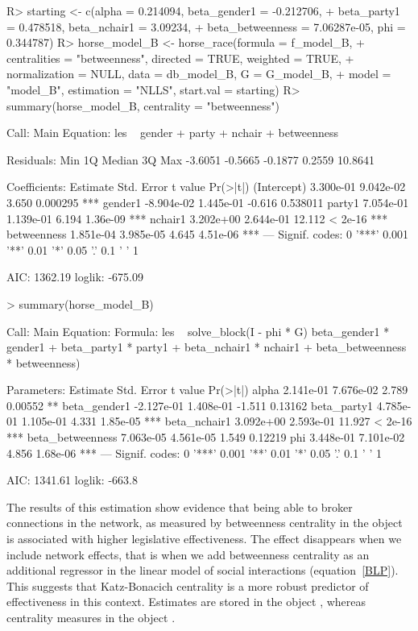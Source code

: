 \documentclass[nojss]{jss}
\begin{document}
\begin{CodeChunk}
\begin{CodeInput}
R> starting <- c(alpha = 0.214094, beta_gender1 = -0.212706,
+    beta_party1 = 0.478518, beta_nchair1 = 3.09234,
+    beta_betweenness = 7.06287e-05, phi = 0.344787) 
R> horse_model_B <- horse_race(formula = f_model_B, 
+    centralities = "betweenness", directed = TRUE, weighted = TRUE, 
+    normalization = NULL, data = db_model_B, G = G_model_B,
+    model = "model_B", estimation = "NLLS", start.val = starting)
R> summary(horse_model_B, centrality = "betweenness")
\end{CodeInput}
\begin{CodeOutput}
Call:
Main Equation:  les ~ gender + party + nchair + betweenness

Residuals:
Min      1Q  Median      3Q     Max 
-3.6051 -0.5665 -0.1877  0.2559 10.8641 

Coefficients:
Estimate Std. Error t value Pr(>|t|)    
(Intercept)  3.300e-01  9.042e-02   3.650 0.000295 ***
gender1     -8.904e-02  1.445e-01  -0.616 0.538011    
party1       7.054e-01  1.139e-01   6.194 1.36e-09 ***
nchair1      3.202e+00  2.644e-01  12.112  < 2e-16 ***
betweenness  1.851e-04  3.985e-05   4.645 4.51e-06 ***
---
Signif. codes:  0 '***' 0.001 '**' 0.01 '*' 0.05 '.' 0.1 ' ' 1

AIC: 1362.19  loglik: -675.09
\end{CodeOutput}
\begin{CodeInput}
> summary(horse_model_B)
\end{CodeInput}
\begin{CodeOutput}
Call:
Main Equation:
Formula: les ~ solve_block(I - phi * G) %
beta_gender1 * gender1 + beta_party1 * party1 + 
beta_nchair1 * nchair1 + beta_betweenness * betweenness)

Parameters:
Estimate Std. Error t value Pr(>|t|)    
alpha             2.141e-01  7.676e-02   2.789  0.00552 ** 
beta_gender1     -2.127e-01  1.408e-01  -1.511  0.13162    
beta_party1       4.785e-01  1.105e-01   4.331 1.85e-05 ***
beta_nchair1      3.092e+00  2.593e-01  11.927  < 2e-16 ***
beta_betweenness  7.063e-05  4.561e-05   1.549  0.12219    
phi               3.448e-01  7.101e-02   4.856 1.68e-06 ***
---
Signif. codes:  0 '***' 0.001 '**' 0.01 '*' 0.05 '.' 0.1 ' ' 1

AIC: 1341.61  loglik: -663.8
\end{CodeOutput}
\end{CodeChunk}

The results of this estimation show evidence that being able to broker connections in the network, as measured by betweenness centrality in the object 
is associated with higher legislative effectiveness. The effect disappears when we include network effects, that is when we add betweenness centrality as an additional regressor in the linear model of social interactions (equation~\ref{BLP}). This suggests that Katz-Bonacich centrality is a more robust predictor of effectiveness in this context. Estimates are stored in the object , whereas centrality measures in the object .
\end{document}
